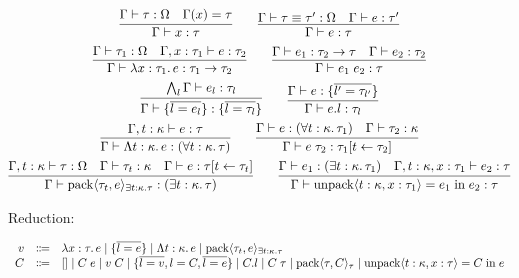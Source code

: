 \begin{gather*}
  \infer{\Gamma \vdash x: \tau}{
    \Gamma \vdash \tau: \Omega
    &
    \Gamma(x) = \tau
  }
  \hspace{2em}
  \infer{\Gamma \vdash e: \tau}{
    \Gamma \vdash \tau \equiv \tau': \Omega
    &
    \Gamma \vdash e: \tau'
  }
  \\
  \infer{\Gamma \vdash \lambda x: \tau_1\ldotp e: \tau_1 \to \tau_2}{
    \Gamma \vdash \tau_1: \Omega
    &
    \Gamma, x: \tau_1 \vdash e: \tau_2
  }
  \hspace{2em}
  \infer{\Gamma \vdash e_1\; e_2: \tau}{
    \Gamma \vdash e_1: \tau_2 \to \tau
    &
    \Gamma \vdash e_2: \tau_2
  }
  \\
  \infer{\Gamma \vdash \{\overline{l = e_l}\}: \{\overline{l = \tau_l}\}}{
    \bigwedge_l \Gamma \vdash e_l: \tau_l
  }
  \hspace{2em}
  \infer{\Gamma \vdash e.l: \tau_l}{
    \Gamma \vdash e: \{\overline{l' = \tau_{l'}}\}
  }
  \\
  \infer{\Gamma \vdash \Lambda t: \kappa\ldotp e: (\forall t: \kappa\ldotp \tau)}{
    \Gamma, t: \kappa \vdash e: \tau
  }
  \hspace{2em}
  \infer{\Gamma \vdash e\; \tau_2: \tau_1[t \assign \tau_2]}{
    \Gamma \vdash e: (\forall t: \kappa\ldotp \tau_1)
    &
    \Gamma \vdash \tau_2: \kappa
  }
  \\
  \infer{\Gamma \vdash \sympack \langle \tau_t, e\rangle_{\exists t: \kappa\ldotp \tau}: (\exists t: \kappa\ldotp \tau)}{
    \Gamma, t: \kappa \vdash \tau: \Omega
    &
    \Gamma \vdash \tau_t: \kappa
    &
    \Gamma \vdash e: \tau[t \assign \tau_t]
  }
  \hspace{2em}
  \infer{\Gamma \vdash \symunpack \langle t: \kappa, x: \tau_1\rangle = e_1 \symin e_2: \tau}{
    \Gamma \vdash e_1: (\exists t: \kappa\ldotp \tau_1)
    &
    \Gamma, t: \kappa, x: \tau_1 \vdash e_2: \tau
  }
\end{gather*}

Reduction:

\begin{align*}
  \begin{array}{rcl}
  v
  & \Coloneq & \lambda x: \tau\ldotp e
  \mid \{\overline{l = e}\}
  \mid \Lambda t: \kappa\ldotp e
  \mid \sympack \langle \tau_t, e\rangle_{\exists t: \kappa\ldotp \tau}
  \\
  C
  & \Coloneq & []
  \mid C\; e
  \mid v\; C
  \mid \{\overline{l = v}, l = C, \overline{l = e}\}
  \mid C.l
  \mid C\; \tau
  \mid \sympack \langle \tau, C\rangle_\tau
  \mid \symunpack \langle t: \kappa, x: \tau\rangle = C \symin e
  \end{array}
\end{align*}

